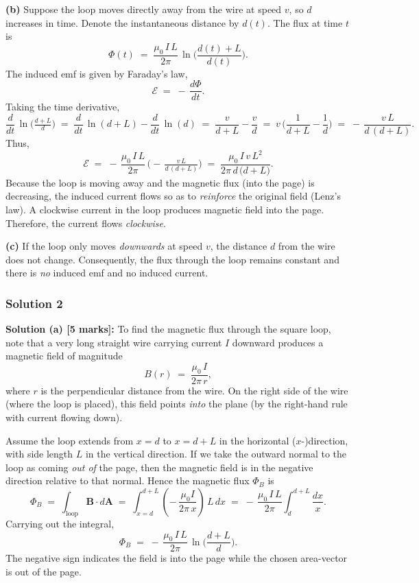 \documentclass{article}
\begin{document}
\noindent
\textbf{(b)} Suppose the loop moves directly away from the wire at speed $v$, so $d$ increases in time.  Denote the instantaneous distance by $d(t)$.  The flux at time $t$ is
\[
\Phi(t) 
\;=\; \frac{\mu_0\,I\,L}{2\pi}\,\ln\!\biggl(\frac{d(t)+L}{d(t)}\biggr).
\]
The induced emf is given by Faraday's law, 
\[
\mathcal{E} 
\;=\; -\,\frac{d\Phi}{dt}.
\]
Taking the time derivative,
\[
\frac{d}{dt}\,\ln\!\bigl(\tfrac{d+L}{d}\bigr)
\;=\; \frac{d}{dt}\,\ln(d+L) - \frac{d}{dt}\,\ln(d)
\;=\; \frac{v}{d+L} - \frac{v}{d}
\;=\; v\,\biggl(\frac{1}{d+L} - \frac{1}{d}\biggr)
\;=\; -\,\frac{v\,L}{d\,(d+L)}.
\]
Thus,
\[
\mathcal{E} 
\;=\; -\,\frac{\mu_0\,I\,L}{2\pi}\,\bigl(-\,\tfrac{v\,L}{d\,(d+L)}\bigr)
\;=\; \frac{\mu_0\,I\,v\,L^2}{2\pi\,d\,\bigl(d+L\bigr)}.
\]
Because the loop is moving away and the magnetic flux (into the page) is decreasing, the induced current flows so as to \emph{reinforce} the original field (Lenz's law).  A clockwise current in the loop produces magnetic field into the page.  Therefore, the current flows \textit{clockwise}.

\noindent
\textbf{(c)} If the loop only moves \emph{downwards} at speed $v$, the distance $d$ from the wire does not change.  Consequently, the flux through the loop remains constant and there is \emph{no} induced emf and no induced current.

\subsubsection{Solution 2}
\noindent
\textbf{Solution (a) [5 marks]:} 
To find the magnetic flux through the square loop, note that a very long straight wire carrying current $I$ downward produces a magnetic field of magnitude 
\[
B(r) \;=\; \frac{\mu_0\,I}{2\pi\,r},
\]
where $r$ is the perpendicular distance from the wire. On the right side of the wire (where the loop is placed), this field points \emph{into} the plane (by the right-hand rule with current flowing down).

\vspace{6pt}
\noindent
Assume the loop extends from $x = d$ to $x = d + L$ in the horizontal ($x$-)direction, with side length $L$ in the vertical direction.  If we take the outward normal to the loop as coming \emph{out of} the page, then the magnetic field is in the negative direction relative to that normal.  Hence the magnetic flux $\Phi_B$ is
\[
\Phi_B \;=\; \int_{\text{loop}} \mathbf{B}\cdot d\mathbf{A}
\;=\; \int_{x=d}^{d+L} \left( -\,\frac{\mu_0 I}{2\pi\,x}\right)\,L \,dx
\;=\; -\,\frac{\mu_0\,I\,L}{2\pi} \int_{d}^{d+L} \frac{dx}{x}.
\]
Carrying out the integral,
\[
\Phi_B
\;=\; -\,\frac{\mu_0\,I\,L}{2\pi}\,\ln\!\biggl(\frac{d+L}{d}\biggr).
\]
The negative sign indicates the field is into the page while the chosen area-vector is out of the page.
\end{document}
